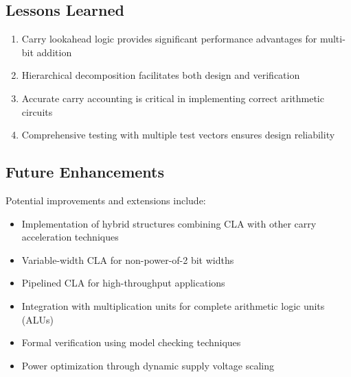 \documentclass[a4paper, 11pt]{article}
\begin{document}

\subsection{Lessons Learned}

\begin{enumerate}
    \item Carry lookahead logic provides significant performance advantages for multi-bit addition
    \item Hierarchical decomposition facilitates both design and verification
    \item Accurate carry accounting is critical in implementing correct arithmetic circuits
    \item Comprehensive testing with multiple test vectors ensures design reliability
\end{enumerate}

\subsection{Future Enhancements}

Potential improvements and extensions include:

\begin{itemize}
    \item Implementation of hybrid structures combining CLA with other carry acceleration techniques
    \item Variable-width CLA for non-power-of-2 bit widths
    \item Pipelined CLA for high-throughput applications
    \item Integration with multiplication units for complete arithmetic logic units (ALUs)
    \item Formal verification using model checking techniques
    \item Power optimization through dynamic supply voltage scaling
\end{itemize}
\end{document}
